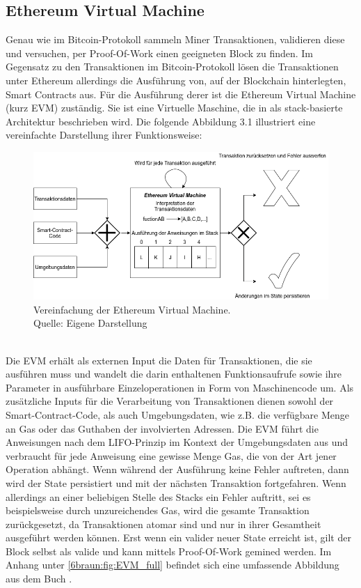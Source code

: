 \subsection{Ethereum Virtual Machine}
Genau wie im Bitcoin-Protokoll sammeln Miner Transaktionen, validieren diese und versuchen, per Proof-Of-Work einen geeigneten Block zu finden.
Im Gegensatz zu den Transaktionen im Bitcoin-Protokoll lösen die Transaktionen unter Ethereum allerdings die Ausführung von, auf der Blockchain hinterlegten, Smart Contracts aus. 
Für die Ausführung derer ist die Ethereum Virtual Machine (kurz EVM) zuständig. 
Sie ist eine Virtuelle Maschine, die in  \cite{wood_yellowpaper_2014} als stack-basierte Architektur beschrieben wird. 
Die folgende Abbildung 3.1 illustriert eine vereinfachte Darstellung ihrer Funktionsweise: 
\begin{figure}[htpb]
	\centering
	\includegraphics[width=\textwidth]{images/evm_simple.png}
	\caption{Vereinfachung der Ethereum Virtual Machine.\\
	Quelle: Eigene Darstellung}
	\label{6braun:fig:evm_simple}
\end{figure}\\
Die EVM erhält als externen Input die Daten für Transaktionen, die sie ausführen muss und wandelt die darin enthaltenen Funktionsaufrufe sowie ihre Parameter in ausführbare Einzeloperationen in Form von Maschinencode um. 
Als zusätzliche Inputs für die Verarbeitung von Transaktionen dienen sowohl der Smart-Contract-Code, als auch Umgebungsdaten, wie z.B. die verfügbare Menge an Gas oder das Guthaben der involvierten Adressen. 
Die EVM führt die Anweisungen nach dem LIFO-Prinzip im Kontext der Umgebungsdaten aus und verbraucht für jede Anweisung eine gewisse Menge Gas, die von der Art jener Operation abhängt. Wenn während der Ausführung keine Fehler auftreten, dann wird der State persistiert und mit der nächsten Transaktion fortgefahren. 
Wenn allerdings an einer beliebigen Stelle des Stacks ein Fehler auftritt, sei es beispielsweise durch unzureichendes Gas, wird die gesamte Transaktion zurückgesetzt, da Transaktionen atomar sind und nur in ihrer Gesamtheit ausgeführt werden können. Erst wenn ein valider neuer State erreicht ist, gilt der Block selbst als valide und kann mittels Proof-Of-Work gemined werden. Im Anhang unter \ref{6braun:fig:EVM_full} befindet sich eine umfassende Abbildung aus dem Buch \cite{antanopoulos_2018}.

